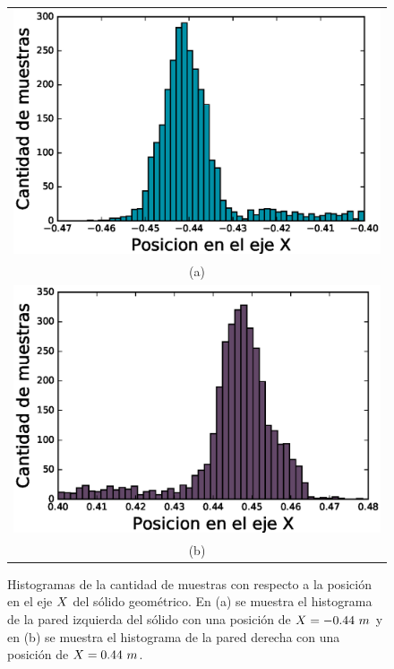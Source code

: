 \begin{figure}%
    \centering
    \begin{tabular}{c}
      \includegraphics[width=.70\textwidth]{images/ErrRegionIZQX.eps}\\
      (a)\\
      \includegraphics[width=.70\textwidth]{images/ErrRegionDERX.eps}\\
      (b)
    \end{tabular}
  \captionsetup{font=footnotesize}
    \caption{\label{f:EstadisticaX}Histogramas de la cantidad de muestras con 
    respecto a la posición en el eje $\mathnormal X$ del sólido geométrico. En (a) se 
    muestra el histograma de la pared izquierda del sólido con una posición de 
    $\mathnormal X = -0.44~m$ y en (b) se muestra el histograma de la pared derecha con una
    posición de $\mathnormal X = 0.44~m$. }
\end{figure}



